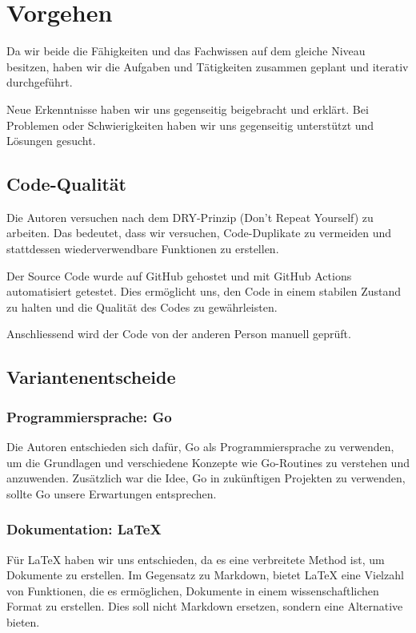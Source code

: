 \section{Vorgehen}
Da wir beide die Fähigkeiten und das Fachwissen auf dem gleiche  Niveau besitzen, haben wir die Aufgaben und Tätigkeiten zusammen geplant und iterativ durchgeführt.
\newline

Neue Erkenntnisse haben wir uns gegenseitig beigebracht und erklärt. Bei Problemen oder Schwierigkeiten haben wir uns gegenseitig unterstützt und Lösungen gesucht.


\subsection{Code-Qualität}

Die Autoren versuchen nach dem DRY-Prinzip (Don't Repeat Yourself) zu arbeiten. Das bedeutet, dass wir versuchen, Code-Duplikate zu vermeiden und stattdessen wiederverwendbare Funktionen zu erstellen.

Der Source Code wurde auf GitHub gehostet und mit GitHub Actions automatisiert getestet. Dies ermöglicht uns, den Code in einem stabilen Zustand zu halten und die Qualität des Codes zu gewährleisten.

Anschliessend wird der Code von der anderen Person manuell geprüft. 
\newline


\subsection{Variantenentscheide}

\subsubsection{Programmiersprache: Go}

Die Autoren entschieden sich dafür, Go als Programmiersprache zu verwenden, um die Grundlagen und verschiedene Konzepte wie Go-Routines zu verstehen und anzuwenden. Zusätzlich war die Idee, Go in zukünftigen Projekten zu verwenden, sollte Go unsere Erwartungen entsprechen.

\subsubsection{Dokumentation: LaTeX}

Für LaTeX haben wir uns entschieden, da es eine verbreitete Method ist, um Dokumente zu erstellen. Im Gegensatz zu Markdown, bietet LaTeX eine Vielzahl von Funktionen, die es ermöglichen, Dokumente in einem wissenschaftlichen Format zu erstellen. \newline
Dies soll nicht Markdown ersetzen, sondern eine Alternative bieten. \newline

